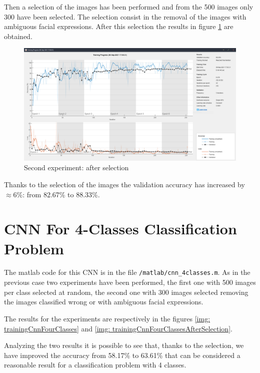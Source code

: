 \documentclass[a4paper]{report}
\begin{document}
	\noindent Then a selection of the images has been performed and from the 500 images only 300 have been selected. The selection consist in the removal of the images with ambiguous facial expressions. After this selection the results in figure \ref{img: trainingCnnTwoClassesAfterSelection} are obtained.
	
	\begin{figure}[htbp]
		\centering
		\includegraphics[scale=0.31]{img/trainingCnnTwoClasses_afterSelection.png}
		\caption{Second experiment: after selection}
		\label{img: trainingCnnTwoClassesAfterSelection}
	\end{figure}

	\noindent Thanks to the selection of the images the validation accuracy has increased by $\approx 6\%$: from 82.67\% to 88.33\%.
	 
	\section{CNN For 4-Classes Classification Problem}
	\noindent The matlab code for this CNN is in the file \texttt{/matlab/cnn\_4classes.m}. As in the previous case two experiments have been performed, the first one with 500 images per class selected at random, the second one with 300 images selected removing the images classified wrong or with ambiguous facial expressions.
	
	\noindent The results for the experiments are respectively in the figures \ref{img: trainingCnnFourClasses} and \ref{img: trainingCnnFourClassesAfterSelection}.
	
	\noindent Analyzing the two results it is possible to see that, thanks to the selection, we have improved the accuracy from 58.17\% to 63.61\% that can be considered a reasonable result for a classification problem with 4 classes.
	
\end{document}
